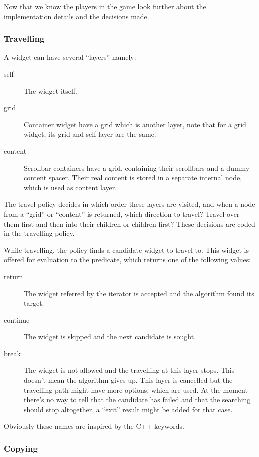 \documentclass[a4paper,notitlepage,twocolumn,draft]{report}
\begin{document}
Now that we know the players in the game look further about the implementation
details and the decisions made.

\subsubsection{Travelling}

A widget can have several ``layers'' namely:

\begin{description}
\item[self] The widget itself.
\item[grid] Container widget have a grid which is another layer, note that for a
	grid widget, its grid and self layer are the same.
\item[content] Scrollbar containers have a grid, containing their scrollbars and
	a dummy content spacer. Their real content is stored in a separate internal
	node, which is used as content layer.
\end{description}

The travel policy decides in which order these layers are visited, and when a
node from a ``grid'' or ``content'' is returned, which direction to travel?
Travel over them first and then into their children or children first? These
decisions are coded in the travelling policy.

While travelling, the policy finds a candidate widget to travel to. This widget is
offered for evaluation to the predicate, which returns one of the following
values:

\begin{description}
\item[return] The widget referred by the iterator is accepted and the algorithm
	found its target.
\item[continue] The widget is skipped and the next candidate is sought.
\item[break] The widget is not allowed and the travelling at this layer stops.
	This doesn't mean the algorithm gives up. This layer is cancelled but the
	travelling path might have more options, which are used. At the moment there's
	no way to tell that the candidate has failed and that the searching should stop
	altogether, a ``exit'' result might be added for that case.
\end{description}

Obviously these names are inspired by the C++ keywords.

\subsubsection{Copying}
\end{document}
